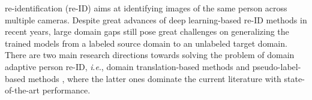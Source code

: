 \documentclass[journal]{IEEEtran}
\newcommand{\ie}{\textit{i}.\textit{e}., }
\begin{document}
 re-identification (re-ID) \cite{9162561,8930088,8466034,wu2018exploit,lin2020unsupervised,wu2019progressive} aims at identifying images of the same person across multiple cameras.
Despite great advances of deep learning-based re-ID methods in recent years,
large domain gaps still pose great challenges on generalizing the trained models from a labeled source domain to an unlabeled target domain.
There are two main research directions towards solving the problem of domain adaptive person re-ID, \ie domain translation-based methods \cite{deng2018image,wei2018person,deng2018similarity,chen2019instance,tang2020cgan,huang2019sbsgan} and pseudo-label-based methods \cite{fan2018unsupervised,zhang2019self,yang2019selfsimilarity,ge2020mutual},
where the latter ones dominate the current literature with state-of-the-art performance.
\end{document}
